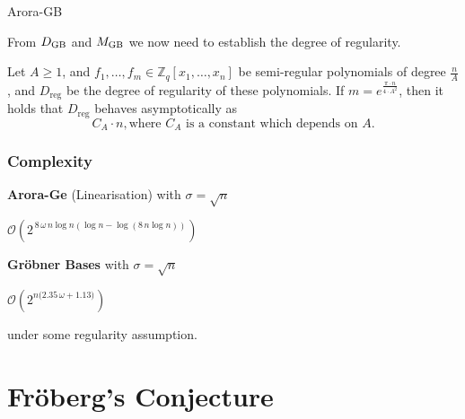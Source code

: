\documentclass[10pt]{beamer}
\newcommand{\Dreg}{D_{\mathrm{reg}}}
\newcommand{\bigO}[1]{\ensuremath{\mathcal{O}\left({#1}\right)}\xspace}
\newcommand{\Zq}{\ensuremath{\mathbb{Z}_q}}
\newcommand{\nbvar}{n}
\def\DGB{D_{{\rm GB}}}
\def\MGB{M_{{\rm GB}}}
\begin{document}
\begin{frame}[allowframebreaks]{Arora-GB}
\framebreak

From $\DGB$ and $\MGB$ we now need to establish the degree of regularity.

\vspace{1em}

\begin{lemma}\label{the:lemma:gb}
Let $A \geq 1$, and $f_1 ,\ldots,f_{m} \in \Zq[x_1,\ldots,x_{\nbvar}] $ be 
semi-regular polynomials of degree $\frac{n}{A}$, and $\Dreg$ be the degree of regularity of these polynomials. 
If $m=e^{\frac{\pi \cdot n}{4 \cdot A^2}}$, then it holds that $\Dreg$ behaves asymptotically as 
$$
C_A \cdot  n, \mbox{where $C_A$ is a constant which depends on $A$.}
$$
\end{lemma}

\end{frame}

\begin{frame}
\frametitle{Complexity}


\textbf{Arora-Ge} (Linearisation) with $\sigma = \sqrt{n}$
\begin{center}
\Large $\bigO{2^{\,8\,\omega\,n\log n( \log n - \log({8\, n \log n}))}}$
\end{center}
\phantom{under some regularity assumption.}

\textbf{Gröbner Bases} with $\sigma = \sqrt{n}$
\begin{center}
\Large $\bigO{2^{\nbvar\big(2.35 \,  \omega +1.13\big)}}$
\end{center}
under some regularity assumption.
\end{frame}


\section{Fröberg's Conjecture}
\end{document}
